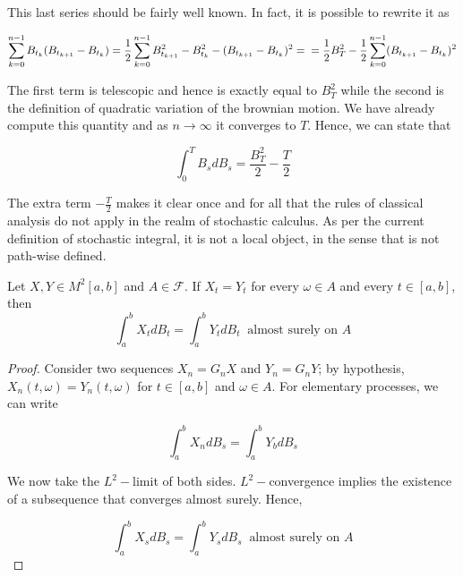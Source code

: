 This last series should be fairly well known. In fact, it is possible to rewrite it as 

\begin{equation*}
    \sum_{k=0}^{n-1} B_{t_k} (B_{t_{k+1}}-B_{t_k}) = \frac{1}{2} \sum_{k=0}^{n-1} B_{t_{k+1}}^2 - B_{t_k}^2 - (B_{t_{k+1}}-B_{t_k})^2 = \\
    = \frac{1}{2} B_T^2 - \frac{1}{2} \sum_{k=0}^{n-1} (B_{t_{k+1}} - B_{t_k})^2
\end{equation*}

The first term is telescopic and hence is exactly equal to $B_T^2$ while the second is the definition of quadratic variation of the brownian motion. We have already compute this quantity and as $n \to \infty$ it converges to $T$. Hence, we can state that

\begin{equation*}
    \int_0^T B_s dB_s = \frac{B_T^2}{2} - \frac{T}{2}
\end{equation*}

The extra term $-\frac{T}{2}$ makes it clear once and for all that the rules of classical analysis do not apply in the realm of stochastic calculus. As per the current definition of stochastic integral, it is not a local object, in the sense that is not path-wise defined. 

\begin{theorem}
    Let $X,Y \in M^2[a,b]$ and $A \in \mathcal{F}$. If $X_t = Y_t$ for every $\omega \in A$ and every $t \in [a,b]$, then 
    \begin{equation*}
        \int_a^b X_t dB_t = \int_a^b Y_t dB_t \;\; \text{almost surely on $A$}
    \end{equation*}
\end{theorem}
\begin{proof}
    Consider two sequences $X_n = G_n X$ and $Y_n = G_n Y$; by hypothesis, $X_n(t,\omega) = Y_n (t,\omega)$ for $t \in [a,b]$ and $\omega \in A$. For elementary processes, we can write

    \begin{equation*}
        \int_a^b X_n dB_s = \int_a^b Y_b dB_s
    \end{equation*}

    We now take the $L^2-$limit of both sides. $L^2-$convergence implies the existence of a subsequence that converges almost surely. Hence,

    \begin{equation*}
        \int_a^b X_s dB_s = \int_a^b Y_s dB_s \;\; \text{almost surely on $A$}
    \end{equation*}
\end{proof}

